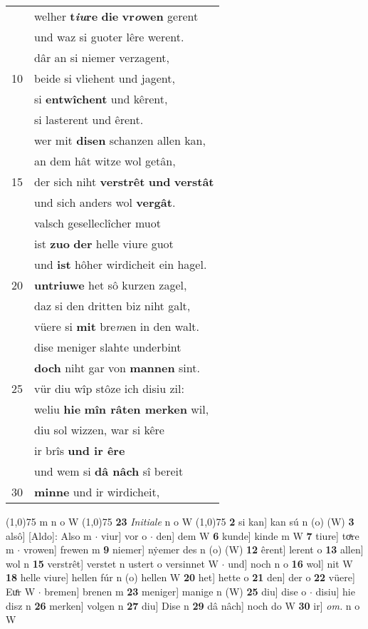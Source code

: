 \documentclass[8pt,a4paper,notitlepage]{article}
\begin{document}
\begin{table}[ht]
\begin{minipage}[t]{0.5\linewidth}
\begin{tabular}{rl}
 & welher \textbf{t\textit{iu}re} \textbf{die} \textbf{vr\textit{o}wen} gerent\\ 
 & und waz si guoter lêre werent.\\ 
 & dâr an si niemer verzagent,\\ 
10 & beide si vliehent und jagent,\\ 
 & si \textbf{entwîchent} und kêrent,\\ 
 & si lasterent und êrent.\\ 
 & wer mit \textbf{disen} schanzen allen kan,\\ 
 & an dem hât witze wol getân,\\ 
15 & der sich niht \textbf{verstrêt} \textbf{und} \textbf{verstât}\\ 
 & und sich anders wol \textbf{vergât}.\\ 
 & valsch geselleclîcher muot\\ 
 & ist \textbf{zuo} \textbf{der} helle viure guot\\ 
 & und \textbf{ist} hôher wirdicheit ein hagel.\\ 
20 & \textbf{untriuwe} het sô kurzen zagel,\\ 
 & daz si den dritten biz niht galt,\\ 
 & vüere si \textbf{mit} bre\textit{m}en in den walt.\\ 
 & dise meniger slahte underbint\\ 
 & \textbf{doch} niht gar von \textbf{mannen} sint.\\ 
25 & vür diu wîp stôze ich disiu zil:\\ 
 & weliu \textbf{hie} \textbf{mîn râten merken} wil,\\ 
 & diu sol wizzen, war si kêre\\ 
 & ir brîs \textbf{und ir êre}\\ 
 & und wem si \textbf{dâ nâch} sî bereit\\ 
30 & \textbf{minne} und ir wirdicheit,\\ 
\end{tabular}
\scriptsize
\line(1,0){75} \newline
m n o W \newline
\line(1,0){75} \newline
\textbf{23} \textit{Initiale} n o W  \newline
\line(1,0){75} \newline
\textbf{2} si kan] kan sú n (o) (W) \textbf{3} alsô] [Aldo]: Also m  $\cdot$ viur] vor o  $\cdot$ den] dem W \textbf{6} kunde] kinde m W \textbf{7} tiure] toͯre m  $\cdot$ vrowen] frewen m \textbf{9} niemer] nẏemer des n (o) (W) \textbf{12} êrent] lerent o \textbf{13} allen] wol n \textbf{15} verstrêt] verstet n ustert o versinnet W  $\cdot$ und] noch n o \textbf{16} wol] nit W \textbf{18} helle viure] hellen fúr n (o) hellen W \textbf{20} het] hette o \textbf{21} den] der o \textbf{22} vüere] Euͤr W  $\cdot$ bremen] brenen m \textbf{23} meniger] manige n (W) \textbf{25} diu] dise o  $\cdot$ disiu] hie disz n \textbf{26} merken] volgen n \textbf{27} diu] Dise n \textbf{29} dâ nâch] noch do W \textbf{30} ir] \textit{om.} n o W \newline

\end{minipage}
\end{table}
\end{document}

